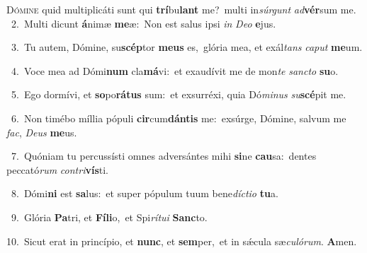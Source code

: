 \lettrine{\initial\textcolor{\initialcolor}{D}}{ómine} quid multiplicáti sunt qui \textbf{trí}\-bu\textbf{lant} me?~\star multi in\-\textit{súr}\-\textit{gunt} \textit{ad}\-\textbf{vér}sum me.\\
{\numbfont\textcolor{\numbcolor}{~2.}}~Multi dicunt \textbf{á}\-nimæ \textbf{me}\-æ:~\star Non est salus ipsi \textit{in} \textit{De}\-\textit{o} \textbf{e}\-jus.\par
{\numbfont\textcolor{\numbcolor}{~3.}}~Tu autem, Dómine, su\-\textbf{scép}\-tor \textbf{me}\-\textbf{us} es,~\star glória mea, et exál\textit{tans} \textit{ca}\-\textit{put} \textbf{me}\-um.\par
{\numbfont\textcolor{\numbcolor}{~4.}}~Voce mea ad Dómi\textbf{num} cla\-\textbf{má}\-vi:~\star et exaudívit me de mon\textit{te} \textit{sanc}\-\textit{to} \textbf{su}\-o.\par
{\numbfont\textcolor{\numbcolor}{~5.}}~Ego dormívi, et \textbf{so}\-po\-\textbf{rá}\-\textbf{tus} sum:~\star et exsurréxi, quia Dó\-\textit{mi}\-\textit{nus} \textit{su}\-\textbf{scé}pit me.\par
{\numbfont\textcolor{\numbcolor}{~6.}}~Non timébo míllia pópuli \textbf{cir}\-cum\-\textbf{dán}\-\textbf{tis} me:~\star exsúrge, Dómine, salvum me \textit{fac}\-, \textit{De}\-\textit{us} \textbf{me}\-us.\par
{\numbfont\textcolor{\numbcolor}{~7.}}~Quóniam tu percussísti omnes adversántes mihi \textbf{si}\-ne \textbf{cau}\-sa:~\star dentes peccató\textit{rum} \textit{con}\-\textit{tri}\textbf{vís}ti.\par
{\numbfont\textcolor{\numbcolor}{~8.}}~Dómi\textbf{ni} est \textbf{sa}\-lus:~\star et super pópulum tuum bene\-\textit{díc}\-\textit{ti}\textit{o} \textbf{tu}\-a.\par
{\numbfont\textcolor{\numbcolor}{~9.}}~Glória \textbf{Pa}\-tri, et \textbf{Fí}\-\textbf{li}o,~\star et Spi\-\textit{rí}\-\textit{tu}\textit{i} \textbf{Sanc}\-to.\par
{\numbfont\textcolor{\numbcolor}{10.}}~Sicut erat in princípio, et \textbf{nunc}\-, et \textbf{sem}\-per,~\star et in sǽcula sæ\-\textit{cu}\-\textit{ló}\textit{rum}. \textbf{A}\-men.\par
